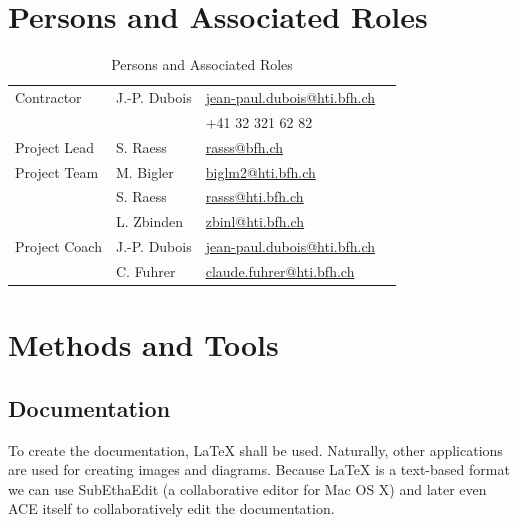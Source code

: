 \documentclass[11pt,a4paper]{article}
\begin{document}
\newpage
\appendix

\section{Persons and Associated Roles}

\begin{table}[H]
 \begin{center}
 \begin{tabular}{|l|l|l|l|}
 \hline
 Contractor             &  J.-P. Dubois     & \href{mailto:doj@bfh.ch}{jean-paul.dubois@hti.bfh.ch} \\
                        &                   &  +41 32 321 62 82 \\
 \hline
 Project Lead           &  S. Raess         & \href{mailto:rasss@bfh.ch}{rasss@bfh.ch} \\
 \hline
 Project Team           &  M. Bigler        & \href{mailto:biglm2@bfh.ch}{biglm2@hti.bfh.ch} \\ 
                        &  S. Raess         & \href{mailto:rasss@bfh.ch}{rasss@hti.bfh.ch} \\
                        &  L. Zbinden       & \href{mailto:zbinl@bfh.ch}{zbinl@hti.bfh.ch} \\
 \hline
 Project Coach          &  J.-P. Dubois     & \href{mailto:doj@bfh.ch}{jean-paul.dubois@hti.bfh.ch} \\
                        &  C. Fuhrer        & \href{frc@bfh.ch}{claude.fuhrer@hti.bfh.ch} \\
 \hline
 \end{tabular}
 \end{center}
 \caption{Persons and Associated Roles}
 \label{table: Persons and Associated Roles}
\end{table}


\section{Methods and Tools}

\subsection{Documentation}
To create the documentation, \LaTeX{} shall be used. Naturally, other 
applications are used for creating images and diagrams. Because \LaTeX{} is a 
text-based format we can use SubEthaEdit (a collaborative editor for Mac OS X) 
and later even ACE itself to collaboratively edit the documentation. 
\end{document}

